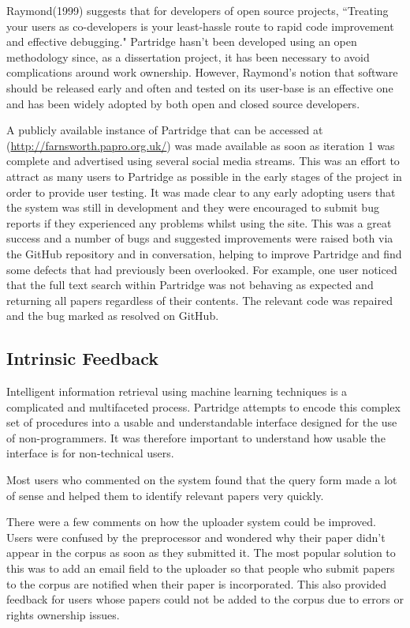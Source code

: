 Raymond(1999) suggests that for developers of open source projects, ``Treating
your users as co-developers is your least-hassle route to rapid code
improvement and effective debugging\cite{raymond1999cathedral}." Partridge
hasn't been developed using an open methodology since, as a dissertation
project, it has been necessary to avoid complications around work ownership.
However, Raymond's notion that software should be released early and often and
tested on its user-base is an effective one and has been widely adopted by both
open and closed source developers\cite{linux2013}\cite{unity2013}.

A publicly available instance of Partridge that can be accessed at
(\url{http://farnsworth.papro.org.uk/}) was made available as soon as iteration
1 was complete and advertised using several social media streams. This was an
effort to attract as many users to Partridge as possible in the early stages of
the project in order to provide user testing. It was made clear to any early
adopting users that the system was still in development and they were
encouraged to submit bug reports if they experienced any problems whilst using
the site. This was a great success and a number of bugs and suggested
improvements were raised both via the GitHub repository and in conversation,
helping to improve Partridge and find some defects that had previously been
overlooked. For example, one user noticed that the full text search within
Partridge was not behaving as expected and returning all papers regardless of
their contents.  The relevant code was repaired and the bug marked as resolved
on GitHub\cite{softlybug2013}.


\subsection{Intrinsic Feedback} 

Intelligent information retrieval using machine learning techniques is a
complicated and multifaceted process. Partridge attempts to encode this complex set of
procedures into a usable and understandable interface designed for the use of
non-programmers. It was therefore important to understand how usable the
interface is for non-technical users.

Most users who commented on the system found that the query form made a lot of
sense and helped them to identify relevant papers very quickly. 

There were a few comments on how the uploader system could be improved. Users
were confused by the preprocessor and wondered why their paper didn't appear in
the corpus as soon as they submitted it. The most popular solution to this was
to add an email field to the uploader so that people who submit papers to the
corpus are notified when their paper is incorporated. This also provided
feedback for users whose papers could not be added to the corpus due to errors
or rights ownership issues.


